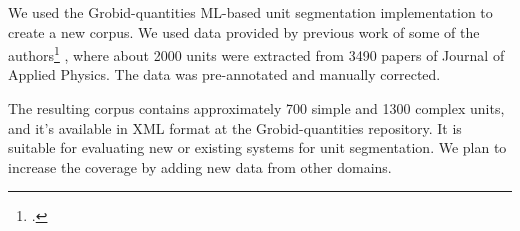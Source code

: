 \documentclass[a4paper,11pt]{article}
\begin{document}
We used the Grobid-quantities ML-based unit segmentation implementation to create a new corpus. We used data provided by previous work of some of the authors\footcite{suzuki2018constructing} , where about 2000 units were extracted from 3490 papers of Journal of Applied Physics. The data was pre-annotated and manually corrected. 

The resulting corpus contains approximately 700 simple and 1300 complex units, and it's available in XML format at the Grobid-quantities repository\footnotemark[3]. It is suitable for evaluating new or existing systems for unit segmentation. We plan to increase the coverage by adding new data from other domains.
\end{document}
